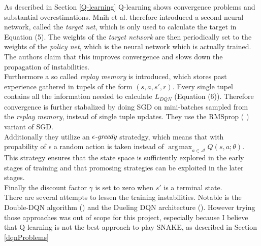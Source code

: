 \documentclass{article}
\DeclareMathOperator*{\argmax}{arg\!max}
\begin{document}
As described in Section \ref{Q-learning} Q-learning shows convergence problems and substantial overestimations. Mnih et al. therefore introduced a second neural network, called the \emph{target net}, which is only used to calculate the target in Equation (5). The weights of the \emph{target network} are then periodically set to the weights of the \emph{policy net}, which is the neural network which is actually trained. The authors claim that this improves convergence and slows down the propagation of instabilities. \\
Furthermore a so called \emph{replay memory} is introduced, which stores past experience gathered in tupels of the form $(s, a, s', r)$. Every single tupel contains all the information needed to calculate $L_{DQN}$ (Equation (6)). Therefore convergence is further stabalized by doing SGD on mini-batches sampled from the \emph{replay memory}, instead of single tuple updates. They use the RMSprop ( \cite{tielemann2012}) variant of SGD.\\
Additionally they utilize an $\epsilon \emph{-greedy}$ stratedgy, which means that with propability of $\epsilon$ a random action is taken instead of $\argmax_{a \in \mathcal{A}} Q(s,a;\theta)$. This strategy ensures that the state space is sufficiently explored in the early stages of training and that promosing strategies can be exploited in the later stages. \\
Finally the discount factor $\gamma$ is set to zero when $s'$ is a terminal state.\\

There are several attempts to lessen the training instabilities. Notable is the Double-DQN algorithm (\cite{ddqn}) and the Dueling DQN architecture (\cite{duelingdqn}). However trying those approaches was out of scope for this project, especially because I believe that Q-learning is not the best approach to play SNAKE, as described in Section \ref{dqnProblems}
\end{document}
